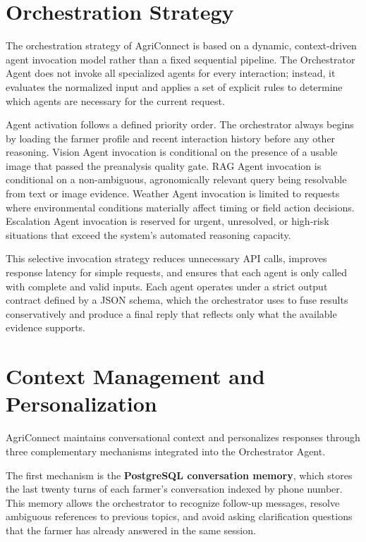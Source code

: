 \section{Orchestration Strategy}

The orchestration strategy of AgriConnect is based on a dynamic, context-driven agent invocation model rather than a fixed sequential pipeline. The Orchestrator Agent does not invoke all specialized agents for every interaction; instead, it evaluates the normalized input and applies a set of explicit rules to determine which agents are necessary for the current request.

Agent activation follows a defined priority order. The orchestrator always begins by loading the farmer profile and recent interaction history before any other reasoning. Vision Agent invocation is conditional on the presence of a usable image that passed the preanalysis quality gate. RAG Agent invocation is conditional on a non-ambiguous, agronomically relevant query being resolvable from text or image evidence. Weather Agent invocation is limited to requests where environmental conditions materially affect timing or field action decisions. Escalation Agent invocation is reserved for urgent, unresolved, or high-risk situations that exceed the system’s automated reasoning capacity.

This selective invocation strategy reduces unnecessary API calls, improves response latency for simple requests, and ensures that each agent is only called with complete and valid inputs. Each agent operates under a strict output contract defined by a JSON schema, which the orchestrator uses to fuse results conservatively and produce a final reply that reflects only what the available evidence supports.

\section{Context Management and Personalization}

AgriConnect maintains conversational context and personalizes responses through three complementary mechanisms integrated into the Orchestrator Agent.

The first mechanism is the \textbf{PostgreSQL conversation memory}, which stores the last twenty turns of each farmer’s conversation indexed by phone number. This memory allows the orchestrator to recognize follow-up messages, resolve ambiguous references to previous topics, and avoid asking clarification questions that the farmer has already answered in the same session.

